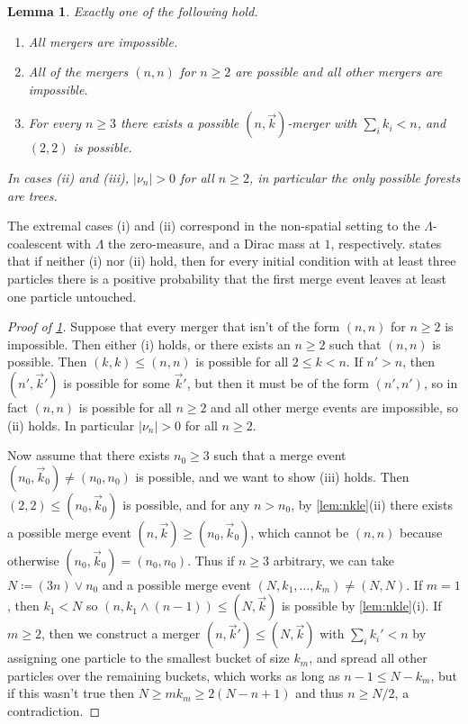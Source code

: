 \documentclass[reqno,draft]{amsart}
\numberwithin{equation}{section}
\theoremstyle{plain}
\newtheorem{lemma}[theorem]{Lemma}
\theoremstyle{remark}
\newcommand{\nut}[1]{|\nu_{#1}|}
\begin{document}
\begin{lemma}\label{lem:exmerge}
    Exactly one of the following hold.
    \begin{enumerate}
        \item All mergers are impossible.
        \item All of the mergers $(n,n)$ for $n \ge 2$ are possible and all other mergers are impossible.
        \item For every $n\ge 3$ there exists a possible $(n,\vec{k})$-merger with $\sum_i k_i < n$, and $(2,2)$ is possible.
    \end{enumerate}
    In cases (ii) and (iii), $\nut{n} > 0$ for all $n\ge 2$, in particular the only possible forests are trees.
\end{lemma}
The extremal cases (i) and (ii) correspond in the non-spatial setting to the $\Lambda$-coalescent with $\Lambda$ the zero-measure, and a Dirac mass at $1$, respectively.  states that if neither (i) nor (ii) hold, then for every initial condition with at least three particles there is a positive probability that the first merge event leaves at least one particle untouched.

\begin{proof}[Proof of \cref{lem:exmerge}]
    Suppose that every merger that isn't of the form $(n,n)$ for $n \ge 2$ is impossible. Then either (i) holds, or there exists an $n\ge 2$ such that $(n,n)$ is possible. Then $(k,k) \le (n,n)$ is possible for all $2 \le k < n$. If $n' > n$, then $(n',\vec{k}')$ is possible for some $\vec{k}'$, but then it must be of the form $(n',n')$, so in fact $(n,n)$ is possible for all $n \ge 2$ and all other merge events are impossible, so (ii) holds. In particular $\nut{n} > 0$ for all $n\ge 2$.

    Now assume that there exists $n_0 \ge 3$ such that a merge event $(n_0,\vec{k}_0) \neq (n_0,n_0)$ is possible, and we want to show (iii) holds. Then $(2,2) \le (n_0,\vec{k}_0)$ is possible, and for any $n > n_0$, by \cref{lem:nkle}(ii) there exists a possible merge event $(n,\vec{k}) \ge (n_0,\vec{k}_0)$, which cannot be $(n,n)$ because otherwise $(n_0,\vec{k}_0) = (n_0,n_0)$. Thus if $n\ge 3$ arbitrary, we can take $N \coloneqq  (3n)\vee n_0$ and a possible merge event $(N,k_1, \ldots ,k_m) \neq (N,N)$. If $m = 1$, then $k_1 < N$ so $(n,k_1 \wedge (n-1)) \le (N,\vec{k})$ is possible by \cref{lem:nkle}(i). If $m \ge 2$, then we construct a merger $(n,\vec{k}') \le (N,\vec{k})$ with $\sum_i k_i' < n$ by assigning one particle to the smallest bucket of size $k_m$, and spread all other particles over the remaining buckets, which works as long as $n-1 \le N-k_m$, but if this wasn't true then $N \ge m  k_m \ge 2(N-n+1)$ and thus $n \ge N / 2$, a contradiction.
\end{proof}
\end{document}
